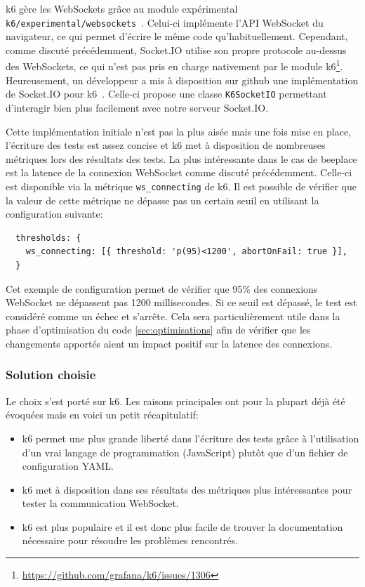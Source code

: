 k6 gère les WebSockets grâce au module expérimental \texttt{k6/experimental/websockets}~\cite{k6-websockets}. Celui-ci implémente l'API WebSocket du navigateur, ce qui permet d'écrire le même code qu'habituellement. Cependant, comme discuté précédemment, Socket.IO utilise son propre protocole au-dessus des WebSockets, ce qui n'est pas pris en charge nativement par le module k6\footnote{\url{https://github.com/grafana/k6/issues/1306}}. Heureusement, un développeur a mis à disposition sur \gls{github} une implémentation de Socket.IO pour k6~\cite{k6-socket-io}. Celle-ci propose une classe \texttt{K6SocketIO} permettant d'interagir bien plus facilement avec notre serveur Socket.IO.

Cette implémentation initiale n'est pas la plus aisée mais une fois mise en place, l'écriture des tests est assez concise et k6 met à disposition de nombreuses métriques lors des résultats des tests. La plus intéressante dans le cas de \gls{beeplace} est la latence de la connexion WebSocket comme discuté précédemment. Celle-ci est disponible via la métrique \texttt{ws_connecting} de k6. Il est possible de vérifier que la valeur de cette métrique ne dépasse pas un certain seuil en utilisant la configuration suivante:

\begin{verbatim}
  thresholds: {
    ws_connecting: [{ threshold: 'p(95)<1200', abortOnFail: true }],
  }
\end{verbatim}

Cet exemple de configuration permet de vérifier que 95\% des connexions WebSocket ne dépassent pas 1200 millisecondes. Si ce seuil est dépassé, le test est considéré comme un échec et s'arrête. Cela sera particulièrement utile dans la phase d'optimisation du code \ref{sec:optimisations} afin de vérifier que les changements apportés aient un impact positif sur la latence des connexions.

\subsubsection{Solution choisie}

Le choix s'est porté sur k6. Les raisons principales ont pour la plupart déjà été évoquées mais en voici un petit récapitulatif:

\begin{itemize}
  \item k6 permet une plus grande liberté dans l'écriture des tests grâce à l'utilisation d'un vrai langage de programmation (JavaScript) plutôt que d'un fichier de configuration YAML.
  \item k6 met à disposition dans ses résultats des métriques plus intéressantes pour tester la communication WebSocket.
  \item k6 est plus populaire et il est donc plus facile de trouver la documentation nécessaire pour résoudre les problèmes rencontrés.
\end{itemize}

